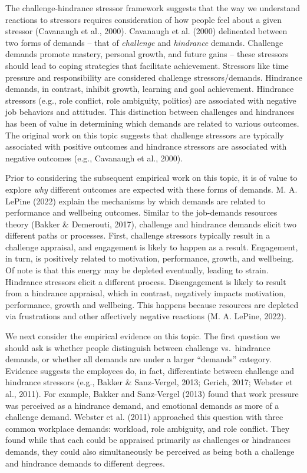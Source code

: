 \documentclass[
  english,
  man]{apa6}
\begin{document}
The challenge-hindrance stressor framework suggests that the way we understand reactions to stressors requires consideration of how people feel about a given stressor (Cavanaugh et al., 2000). Cavanaugh et al. (2000) delineated between two forms of demands -- that of \emph{challenge} and \emph{hindrance} demands. Challenge demands promote mastery, personal growth, and future gains -- these stressors should lead to coping strategies that facilitate achievement. Stressors like time pressure and responsibility are considered challenge stressors/demands. Hindrance demands, in contrast, inhibit growth, learning and goal achievement. Hindrance stressors (e.g., role conflict, role ambiguity, politics) are associated with negative job behaviors and attitudes. This distinction between challenges and hindrances has been of value in determining which demands are related to various outcomes. The original work on this topic suggests that challenge stressors are typically associated with positive outcomes and hindrance stressors are associated with negative outcomes (e.g., Cavanaugh et al., 2000).

Prior to considering the subsequent empirical work on this topic, it is of value to explore \emph{why} different outcomes are expected with these forms of demands. M. A. LePine (2022) explain the mechanisms by which demands are related to performance and wellbeing outcomes. Similar to the job-demands resources theory (Bakker \& Demerouti, 2017), challenge and hindrance demands elicit two different paths or processes. First, challenge stressors typically result in a challenge appraisal, and engagement is likely to happen as a result. Engagement, in turn, is positively related to motivation, performance, growth, and wellbeing. Of note is that this energy may be depleted eventually, leading to strain. Hindrance stressors elicit a different process. Disengagement is likely to result from a hindrance appraisal, which in contrast, negatively impacts motivation, performance, growth and wellbeing. This happens because resources are depleted via frustrations and other affectively negative reactions (M. A. LePine, 2022).

We next consider the empirical evidence on this topic. The first question we should ask is whether people distinguish between challenge vs.~hindrance demands, or whether all demands are under a larger ``demands'' category. Evidence suggests the employees do, in fact, differentiate between challenge and hindrance stressors (e.g., Bakker \& Sanz-Vergel, 2013; Gerich, 2017; Webster et al., 2011). For example, Bakker and Sanz-Vergel (2013) found that work pressure was perceived as a hindrance demand, and emotional demands as more of a challenge demand. Webster et al. (2011) approached this question with three common workplace demands: workload, role ambiguity, and role conflict. They found while that each could be appraised primarily as challenges or hindrances demands, they could also simultaneously be perceived as being both a challenge and hindrance demands to different degrees.
\end{document}
